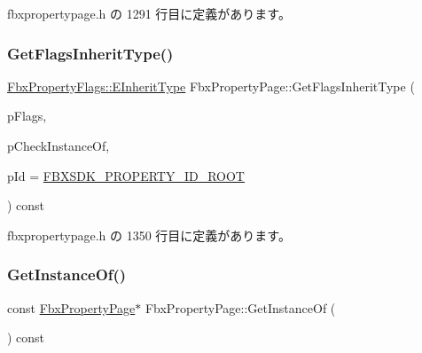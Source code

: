  fbxpropertypage.\+h の 1291 行目に定義があります。

\mbox{\label{class_fbx_property_page_af6cf697779791a81c63e7acb7516229d}} 
\subsubsection{\texorpdfstring{Get\+Flags\+Inherit\+Type()}{GetFlagsInheritType()}}
{\footnotesize\ttfamily \hyperlink{class_fbx_property_flags_ae3b667a4fcac4b827fa186a698fec2f8}{Fbx\+Property\+Flags\+::\+E\+Inherit\+Type} Fbx\+Property\+Page\+::\+Get\+Flags\+Inherit\+Type (\begin{DoxyParamCaption}\item[{\hyperlink{class_fbx_property_flags_afabfa7e0949aac8a7dcdf8a141867e99}{Fbx\+Property\+Flags\+::\+E\+Flags}}]{p\+Flags,  }\item[{bool}]{p\+Check\+Instance\+Of,  }\item[{\hyperlink{fbxtypes_8h_a088fa96de3b0b3ea69f0f6afef525dfb}{Fbx\+Int}}]{p\+Id = {\ttfamily \hyperlink{fbxpropertydef_8h_a291bdb6d8428dce8463143fa3aba2c34}{F\+B\+X\+S\+D\+K\+\_\+\+P\+R\+O\+P\+E\+R\+T\+Y\+\_\+\+I\+D\+\_\+\+R\+O\+OT}} }\end{DoxyParamCaption}) const\hspace{0.3cm}{\ttfamily [inline]}}



 fbxpropertypage.\+h の 1350 行目に定義があります。

\mbox{\label{class_fbx_property_page_ae04ab74504925a3d83ed68bcda0264b8}} 
\subsubsection{\texorpdfstring{Get\+Instance\+Of()}{GetInstanceOf()}\hspace{0.1cm}{\footnotesize\ttfamily [1/2]}}
{\footnotesize\ttfamily const \hyperlink{class_fbx_property_page}{Fbx\+Property\+Page}$\ast$ Fbx\+Property\+Page\+::\+Get\+Instance\+Of (\begin{DoxyParamCaption}{ }\end{DoxyParamCaption}) const\hspace{0.3cm}{\ttfamily [inline]}}




